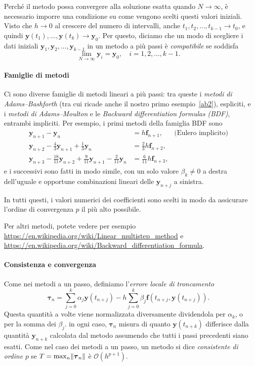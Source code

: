 \documentclass[a4paper]{report}
\DeclarePairedDelimiter{\norm}{\lVert}{\rVert}
\theoremstyle{definiton}
\theoremstyle{remark}
\newcommand{\y}{\mathbf{y}}
\newcommand{\f}{\mathbf{f}}
\begin{document}
Perché il metodo possa convergere alla soluzione esatta quando $N\to\infty$, è necessario imporre una condizione su come vengono scelti questi valori iniziali. Visto che $h\to 0$ al crescere del numero di intervalli, anche $t_1,t_2,\dots,t_{k-1} \to t_0$, e quindi $\y(t_1),\dots,\y(t_k) \to \y_0$. Per questo, diciamo che un modo di scegliere i dati iniziali $\y_1,\y_2,\dots,\y_{k-1}$ in un metodo a più passi è \emph{compatibile} se soddisfa 
\[
\lim_{N\to\infty} \y_i = \y_0, \quad i=1,2,\dots,k-1.
\]


\paragraph{Famiglie di metodi} Ci sono diverse famiglie di metodi lineari a più passi: tra queste i \emph{metodi di Adams--Bashforth} (tra cui ricade anche il nostro primo esempio~\eqref{ab2}), espliciti, e i \emph{metodi di Adams--Moulton} e le \emph{Backward differentiation formulas (BDF)}, entrambi impliciti. Per esempio, i primi metodi della famiglia BDF sono
\begin{align*}
\y_{n+1} - \y_n &= h\f_{n+1}, & \text{(Eulero implicito)}\\
\y_{n+2} - \frac43 \y_{n+1} + \frac13 \y_n &= \frac23 h\f_{n+2},\\
\y_{n+3} - \frac{18}{11}\y_{n+2} + \frac{9}{11}\y_{n+1} - \frac{2}{11}\y_n &= \frac{6}{11}h \f_{n+3},
\end{align*}
e i successivi sono fatti in modo simile, con un solo valore $\beta_k\neq 0$ a destra dell'uguale e opportune combinazioni lineari delle $\y_{n+j}$ a sinistra.

In tutti questi, i valori numerici dei coefficienti sono scelti in modo da assicurare l'ordine di convergenza $p$ il più alto possibile.

Per altri metodi, potete vedere per esempio \url{https://en.wikipedia.org/wiki/Linear_multistep_method} e \url{https://en.wikipedia.org/wiki/Backward_differentiation_formula}.

\paragraph{Consistenza e convergenza}

Come nei metodi a un passo, definiamo l'\emph{errore locale di troncamento}
\[
\boldsymbol{\tau}_n = \sum_{j=0}^k \alpha_j \y(t_{n+j}) - h\sum_{j=0}^k \beta_j \f(t_{n+j}, \y(t_{n+j})).
\]
Questa quantità a volte viene normalizzata diversamente dividendola per $\alpha_k$, o per la somma dei $\beta_j$. in ogni caso, $\boldsymbol{\tau}_n$ misura di quanto $\y(t_{n+k})$ differisce dalla quantità $\y_{n+k}$ calcolata dal metodo assumendo che tutti i passi precedenti siano esatti. Come nel caso dei metodi a un passo, un metodo si dice \emph{consistente di ordine $p$} se $T = \max_{n} \norm{\boldsymbol{\tau}_n}$ è $\mathcal{O}(h^{p+1})$.
\end{document}
